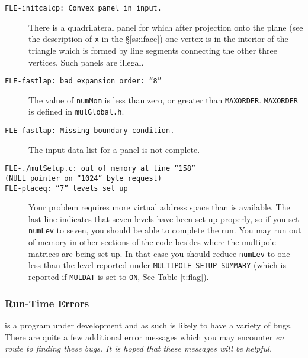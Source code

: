 \begin{description}


\item[{\tt FLE-initcalcp: Convex panel in input.}]

There is a quadrilateral panel for which after projection onto the plane
(see the description of {\tt x} in the \S\ref{ss:iface}) one 
vertex is in the interior of the triangle which is formed by line 
segments connecting the other three vertices.  Such panels are illegal.

\item[{\tt FLE-fastlap: bad expansion order: ``8''}] 

The value of {\tt numMom} is less than zero, or greater than 
{\tt MAXORDER}.  {\tt MAXORDER} is defined in {\tt mulGlobal.h}.

\item[{\tt FLE-fastlap:  Missing boundary condition.}]

The input data list for a panel is not complete.

\item[{\tt FLE-./mulSetup.c: out of memory at line ``158''}]
\item[{\tt  (NULL pointer on ``1024'' byte request)}]
\item[{\tt FLE-placeq: ``7'' levels set up}]

Your problem requires more virtual address space than is available.
The last line indicates that seven levels have been set up 
properly, so if you set {\tt numLev} to seven, you should be
able to complete the run.  You may run out of memory in 
other sections of the code besides where the multipole 
matrices are being set up.  In that case you should reduce
{\tt numLev} to one less than the level reported under  
{\tt MULTIPOLE SETUP SUMMARY} (which is reported if  {\tt MULDAT}
is set to {\tt ON}, See Table \ref{t:flag}).

\end{description}

\subsubsection{Run-Time Errors}

\fas is a program under development and as such is likely to have 
a variety of bugs.  There are quite a few additional error messages
which you may encounter \it en route \rm to finding these bugs.  It
is hoped that these messages will be helpful.

\newpage
